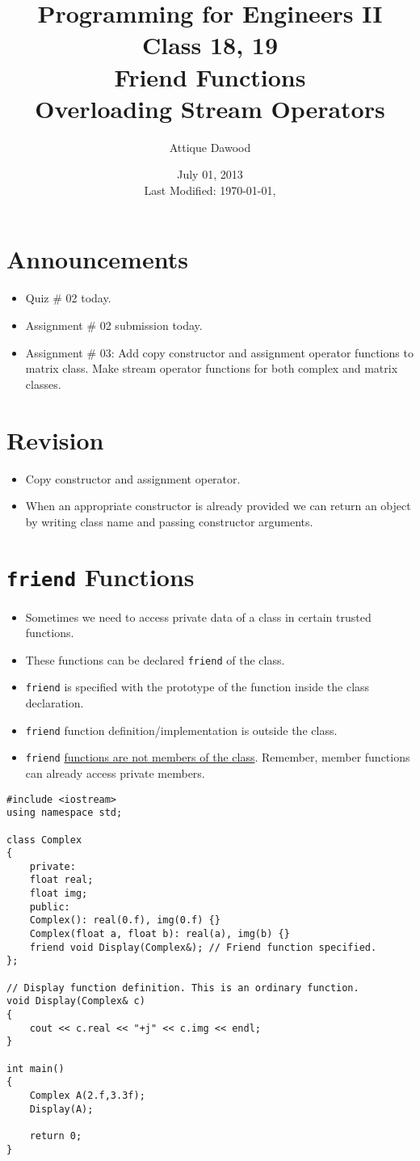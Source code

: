 \documentclass[12pt,a4paper]{article}
\title{\vspace{-2cm}Programming for Engineers II\\Class 18, 19\\Friend Functions\\Overloading Stream Operators}
\author{Attique Dawood}
\date{July 01, 2013\\[0.2cm] Last Modified: \today, \currenttime}
\begin{document}
\maketitle
\section{Announcements}
\begin{itemize}
\item Quiz \# 02 today.
\item Assignment \# 02 submission today.
\item Assignment \# 03: Add copy constructor and assignment operator functions to matrix class. Make stream operator functions for both complex and matrix classes.
\end{itemize}
\section{Revision}
\begin{itemize}
\item Copy constructor and assignment operator.
\item When an appropriate constructor is already provided we can return an object by writing class name and passing constructor arguments.
\end{itemize}
\section{\texttt{friend} Functions}
\begin{itemize}
\item Sometimes we need to access private data of a class in certain trusted functions.
\item These functions can be declared \verb|friend| of the class.
\item \verb|friend| is specified with the prototype of the function inside the class declaration.
\item \verb|friend| function definition/implementation is outside the class.
\item \verb|friend| \underline{functions are not members of the class}. Remember, member functions can already access private members.
\end{itemize}
\begin{lstlisting}[caption={\texttt{friend} function to display Complex number}]
#include <iostream>
using namespace std;

class Complex
{
	private:
	float real;
	float img;
	public:
	Complex(): real(0.f), img(0.f) {}
	Complex(float a, float b): real(a), img(b) {}
	friend void Display(Complex&); // Friend function specified.
};

// Display function definition. This is an ordinary function.
void Display(Complex& c)
{
	cout << c.real << "+j" << c.img << endl;
}

int main()
{
	Complex A(2.f,3.3f);
	Display(A);

	return 0;
}
\end{lstlisting}
\end{document}
